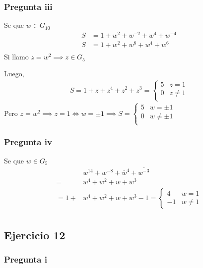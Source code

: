 \subsubsection{Pregunta iii}

Se que $ w \in G_10 $
\begin{align*}
    S &= 1 + w^2 + w^{-2} + w^4 + w^{-4} \\
    S &= 1 + w^2 + w^8 + w^4 + w^6 \\
\end{align*}
Si llamo $ z = w^2 \implies z \in G_5 $

Luego,
\begin{align*}
    S = 1 + z + z^4 + z^2 + z^3 = \begin{cases}
        5 & z = 1 \\
        0 & z \neq 1 \\
    \end{cases}
\end{align*}
Pero $ z = w^2 \implies z = 1 \iff w = \pm 1 \implies S = \begin{cases}
    5 & w = \pm 1 \\
    0 & w \neq \pm 1 \\
\end{cases} $

\subsubsection{Pregunta iv}

Se que $ w \in G_5 $
\begin{align*}
    &w^{14} + w^{-8} + \overline{w}^4 + \overline{w^{-3}} \\
    = &w^4 + w^2 + w + w^3 \\
    = 1 + &w^4 + w^2 + w + w^3 -1 = \begin{cases}
        4 & w = 1 \\
        -1 & w \neq 1
    \end{cases}\\
\end{align*}

\subsection{Ejercicio 12}

\subsubsection{Pregunta i}

